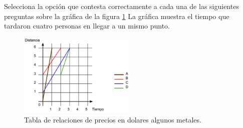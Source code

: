 \question[10] Selecciona la opci\'on que contesta correctamente
a cada una de las siguientes preguntas sobre la gr\'afica de la figura \ref{fig:SINMAT1_U3_AC73_IMG1}
La gráfica muestra el tiempo que tardaron cuatro personas en llegar a un mismo punto.
\begin{figure}[H]
    \centering
    \includegraphics[width=0.5\textwidth]{../images/SINMAT1_U3_AC73_IMG1}
    \caption{Tabla de relaciones de precios en dolares algunos metales.}
    \label{fig:SINMAT1_U3_AC73_IMG1}
\end{figure}
\begin{parts}
    
    
    \newpage
    
    
    
    
    
    
    
    
\end{parts}